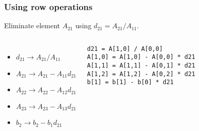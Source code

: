 \begin{frame}[fragile]
  \frametitle{Using row operations}
  Eliminate element $A_{21}$ using $d_{21}=A_{21}/A_{11}$.
  \vfill
  \vfill\pause
  \begin{columns}
  \begin{itemize}
    \item $d_{21}\rightarrow A_{21}/A_{11}$
    \item $A_{21}\rightarrow A_{21}-A_{11}d_{21}$
    \item $A_{22}\rightarrow A_{22}-A_{12}d_{21}$
    \item $A_{23}\rightarrow A_{23}-A_{13}d_{21}$
    \item $b_2   \rightarrow b_2   -b_1   d_{21}$
  \end{itemize}
  \pause
   \begin{lstlisting}
d21 = A[1,0] / A[0,0]
A[1,0] = A[1,0] - A[0,0] * d21
A[1,1] = A[1,1] - A[0,1] * d21
A[1,2] = A[1,2] - A[0,2] * d21
b[1] = b[1] - b[0] * d21
   \end{lstlisting}
  \end{columns}
\end{frame}

